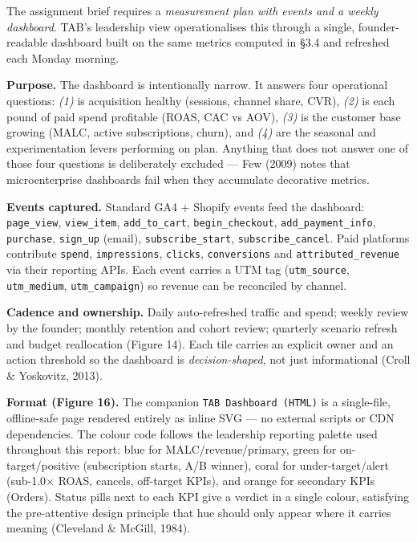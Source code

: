 \documentclass[
  11pt,
]{article}
\begin{document}
The assignment brief requires a \emph{measurement plan with events and a
weekly dashboard}. TAB's leadership view operationalises this through a
single, founder-readable dashboard built on the same metrics computed in
§3.4 and refreshed each Monday morning.

\textbf{Purpose.} The dashboard is intentionally narrow. It answers four
operational questions: \emph{(1)} is acquisition healthy (sessions,
channel share, CVR), \emph{(2)} is each pound of paid spend profitable
(ROAS, CAC vs AOV), \emph{(3)} is the customer base growing (MALC,
active subscriptions, churn), and \emph{(4)} are the seasonal and
experimentation levers performing on plan. Anything that does not answer
one of those four questions is deliberately excluded --- Few (2009)
notes that microenterprise dashboards fail when they accumulate
decorative metrics.

\textbf{Events captured.} Standard GA4 + Shopify events feed the
dashboard: \texttt{page\_view}, \texttt{view\_item},
\texttt{add\_to\_cart}, \texttt{begin\_checkout},
\texttt{add\_payment\_info}, \texttt{purchase}, \texttt{sign\_up}
(email), \texttt{subscribe\_start}, \texttt{subscribe\_cancel}. Paid
platforms contribute \texttt{spend}, \texttt{impressions},
\texttt{clicks}, \texttt{conversions} and \texttt{attributed\_revenue}
via their reporting APIs. Each event carries a UTM tag
(\texttt{utm\_source}, \texttt{utm\_medium}, \texttt{utm\_campaign}) so
revenue can be reconciled by channel.

\textbf{Cadence and ownership.} Daily auto-refreshed traffic and spend;
weekly review by the founder; monthly retention and cohort review;
quarterly scenario refresh and budget reallocation (Figure 14). Each
tile carries an explicit owner and an action threshold so the dashboard
is \emph{decision-shaped}, not just informational (Croll \& Yoskovitz,
2013).

\textbf{Format (Figure 16).} The companion
\texttt{TAB\ Dashboard\ (HTML)} is a single-file, offline-safe page
rendered entirely as inline SVG --- no external scripts or CDN
dependencies. The colour code follows the leadership reporting palette
used throughout this report: blue for MALC/revenue/primary, green for
on-target/positive (subscription starts, A/B winner), coral for
under-target/alert (sub-1.0\(\times\) ROAS, cancels, off-target KPIs),
and orange for secondary KPIs (Orders). Status pills next to each KPI
give a verdict in a single colour, satisfying the pre-attentive design
principle that hue should only appear where it carries meaning
(Cleveland \& McGill, 1984).
\end{document}
